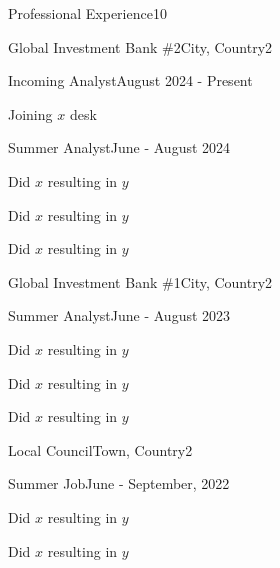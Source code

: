\documentclass[10pt,a4paper]{CV}
\begin{document}
\begin{Section}{Professional Experience}{10}
    \begin{Institution}{Global Investment Bank \#2}{City, Country}{2}
        \begin{Position}{Incoming Analyst}{August 2024 - Present}
            \item Joining $x$ desk
            \vspace{-4pt}
        \end{Position}
        \begin{Position}{Summer Analyst}{June - August 2024}
            \item Did $x$ resulting in $y$
            \item Did $x$ resulting in $y$
            \item Did $x$ resulting in $y$
        \end{Position}
    \end{Institution}
    
    \begin{Institution}{Global Investment Bank \#1}{City, Country}{2}
        \begin{Position}{Summer Analyst}{June - August 2023}
            \item Did $x$ resulting in $y$
            \item Did $x$ resulting in $y$
            \item Did $x$ resulting in $y$
        \end{Position}
    \end{Institution}
    
    \begin{Institution}{Local Council}{Town, Country}{2}
        \begin{Position}{Summer Job}{June - September, 2022}
            \item Did $x$ resulting in $y$
            \item Did $x$ resulting in $y$
        \end{Position}
    \end{Institution}
\end{Section}
\end{document}
